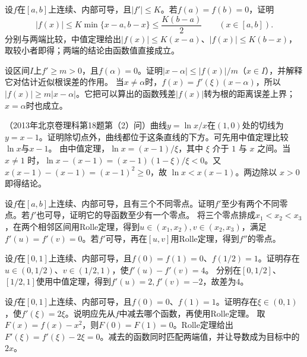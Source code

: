设\(f\)在\([a,b]\)上连续、内部可导，且\(|f'|\le K\)。若\(f(a)=f(b)=0\)，证明
\begin{equation*}
 |f(x)|\le K\min\{x-a,b-x\}\le\frac{K(b-a)}2\qquad(x\in[a,b]).
\end{equation*}
\solutionanswer
分别与两端比较，中值定理给出\(|f(x)|\le K(x-a)\)、\(|f(x)|\le K(b-x)\)，取较小者即得；两端的结论由函数值直接成立。


设区间\(I\)上\(f'\ge m>0\)，且\(f(\alpha)=0\)。证明\(|x-\alpha|\le|f(x)|/m\)（\(x\in I\)），并解释它对估计近似根误差的作用。
\solutionanswer
当\(x\ne\alpha\)时，\(f(x)=f'(\xi)(x-\alpha)\)，所以\(|f(x)|\ge m|x-\alpha|\)。它把可以算出的函数残差\(|f(x)|\)转为根的距离误差上界；\(x=\alpha\)时也成立。


（2013年北京卷理科第18题第（2）问）曲线\(y=\ln x/x\)在\((1,0)\)处的切线为\(y=x-1\)。证明除切点外，曲线都位于这条直线的下方。可先用中值定理比较\(\ln x\)与\(x-1\)。
\solutionanswer
由中值定理，\(\ln x=(x-1)/\xi\)，其中 \(\xi\) 介于 \(1\) 与 \(x\) 之间。当 \(x\ne1\) 时，\(\ln x-(x-1)=(x-1)(1-\xi)/\xi<0\)。又 \(x(x-1)-(x-1)=(x-1)^2\ge0\)，故 \(\ln x<x(x-1)\)。两边除以 \(x>0\) 即得结论。


设\(f\)在\([a,b]\)上连续、内部可导，且有三个不同零点。证明\(f'\)至少有两个不同零点。若\(f'\)也可导，证明它的导函数至少有一个零点。
\solutionanswer
将三个零点排成\(x_1<x_2<x_3\)，在两个相邻区间用Rolle定理，得到\(u\in(x_1,x_2),v\in(x_2,x_3)\)，满足\(f'(u)=f'(v)=0\)。若\(f'\)可导，再在\([u,v]\)用Rolle定理，得到\(f''\)的零点。


设\(f\)在\([0,1]\)上连续、内部可导，且\(f(0)=f(1)=0\)、\(f(1/2)=1\)。证明存在\(u\in(0,1/2)\)、\(v\in(1/2,1)\)，使\(f'(u)-f'(v)=4\)。
\solutionanswer
分别在\([0,1/2]\)、\([1/2,1]\)使用中值定理，得到\(f'(u)=2,f'(v)=-2\)，故差为\(4\)。


设\(f\)在\([0,1]\)上连续、内部可导，且\(f(0)=0\)、\(f(1)=1\)。证明存在\(\xi\in(0,1)\)，使\(f'(\xi)=2\xi\)。说明应先从\(f\)中减去哪个函数，再使用Rolle定理。
\solutionanswer
取\(F(x)=f(x)-x^2\)，则\(F(0)=F(1)=0\)。Rolle定理给出\(F'(\xi)=f'(\xi)-2\xi=0\)。减去的函数同时匹配两端值，并让导数成为目标中的\(2x\)。


